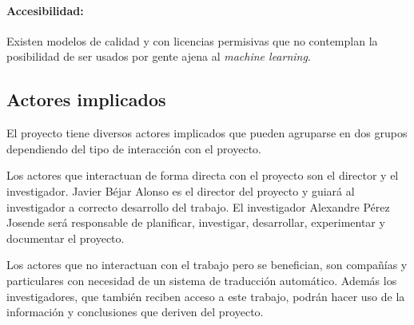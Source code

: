 \paragraph{Accesibilidad:}
Existen modelos de calidad y con licencias permisivas que no contemplan la posibilidad de
ser usados por gente ajena al \textit{machine learning}.


\subsection{Actores implicados}
El proyecto tiene diversos actores implicados que pueden agruparse en dos grupos dependiendo
del tipo de interacción con el proyecto.

Los actores que interactuan de forma directa con el proyecto son el director y el investigador.
Javier Béjar Alonso es el director del proyecto y guiará al investigador a correcto desarrollo
del trabajo. El investigador Alexandre Pérez Josende será responsable de planificar, investigar,
desarrollar, experimentar y documentar el proyecto.

Los actores que no interactuan con el trabajo pero se benefician, son compañías y particulares
con necesidad de un sistema de traducción automático. Además los investigadores, que también reciben
acceso a este trabajo, podrán hacer uso de la información y conclusiones que deriven del proyecto.